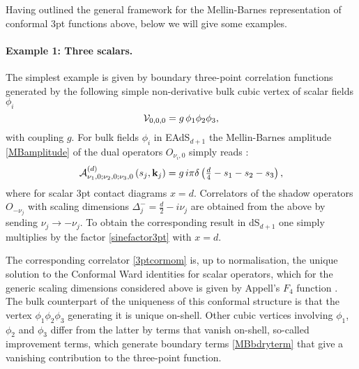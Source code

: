 \documentclass[11pt,a4paper]{article}
\begin{document}
Having outlined the general framework for the Mellin-Barnes representation of conformal 3pt functions above, below we will give some examples.

\paragraph{Example 1: Three scalars.} The simplest example is given by boundary three-point correlation functions generated by the following simple non-derivative bulk cubic vertex of scalar fields $\phi_i$ 
\begin{equation}\label{000V}
    {\cal V}_{0,0,0}=g\,\phi_1\phi_2\phi_3,
\end{equation}
with coupling $g$. For bulk fields $\phi_i$ in EAdS$_{d+1}$ the Mellin-Barnes amplitude \eqref{MBamplitude} of the dual operators $O_{\nu_i,0}$ simply reads \cite{Sleight:2019hfp}:
\begin{equation}\label{scalar3pt}
     {\cal A}^{(d)}_{\nu_1,0;\nu_2,0;\nu_3,0}\left(s_j,{\bf k}_j\right) = g\, i \pi \delta\left(\tfrac{d}{4}-s_1-s_2-s_3\right),
\end{equation}
where for scalar 3pt contact diagrams $x=d$. Correlators of the shadow operators $O_{-\nu_j}$ with scaling dimensions $\Delta^-_j=\frac{d}{2}-i\nu_j$ are obtained from the above by sending $\nu_j \to -\nu_j$. To obtain the corresponding result in dS$_{d+1}$ one simply multiplies by the factor \eqref{sinefactor3pt} with $x=d$.

The corresponding correlator \eqref{3ptcormom} is, up to normalisation, the unique solution to the Conformal Ward identities for scalar operators, which for the generic scaling dimensions considered above is given by Appell's $F_4$ function \cite{Coriano:2013jba,Bzowski:2013sza}. The bulk counterpart of the uniqueness of this conformal structure is that the vertex $\phi_1\phi_2\phi_3$ generating it is unique on-shell. Other cubic vertices involving $\phi_1$, $\phi_2$ and $\phi_3$ differ from the latter by terms that vanish on-shell, so-called improvement terms, which generate boundary terms \eqref{MBbdryterm} that give a vanishing contribution to the three-point function.
\end{document}
